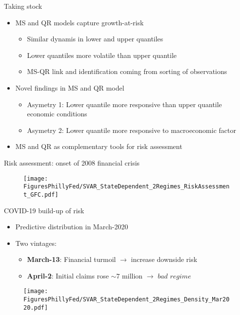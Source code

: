\documentclass[xcolor=dvipsnames, xcolor=table, 10pt]{beamer}
\newcommand{\pb}[1]{{\color{fedblue}#1}}
\begin{document}
\begin{frame}{Taking stock}
\begin{itemize}
\medskip
  \item MS and QR models capture growth-at-risk
\medskip
   \begin{itemize}
       \item Similar dynamis in lower and upper quantiles
         \medskip
       \item Lower quantiles more volatile than upper quantile \citep{ABG19}
       \medskip
       \item MS-QR link and identification coming from sorting of observations
    \end{itemize}
\medskip
\item Novel findings in MS and QR model
\begin{itemize}
      \medskip
     \item Asymetry 1: Lower quantile more responsive than upper quantile economic conditions
       \medskip
     \item Asymetry 2: Lower quantile more responsive to macroeconomic factor
\end{itemize}
\medskip
\item MS and QR as complementary tools for risk assessment
\end{itemize}
\end{frame}

\begin{frame}{Risk assessment: onset of 2008 financial crisis}

\begin{figure}
    \texttt{[image: FiguresPhillyFed/SVAR\_StateDependent\_2Regimes\_RiskAssessment\_GFC.pdf]}
\end{figure}
\end{frame}


\begin{frame}{COVID-19 build-up of risk}

\begin{itemize}
\item Predictive distribution in March-2020
\medskip
\item Two vintages:
\begin{itemize}
\medskip
\item \textbf{March-13}: Financial turmoil $\rightarrow$ increase downside risk
\medskip
\item \pb{\textbf{April-2}}: Initial claims rose $\sim7$ million $\rightarrow$ $\textit{bad regime}$
\end{itemize}
\end{itemize}
\begin{figure}
    \texttt{[image: FiguresPhillyFed/SVAR\_StateDependent\_2Regimes\_Density\_Mar2020.pdf]}
\end{figure}
\end{frame}
\end{document}
